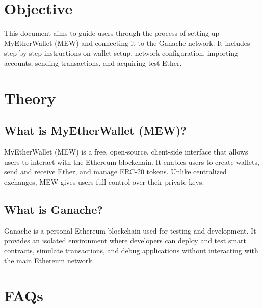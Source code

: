 \documentclass[11pt]{article}
\begin{document}
\tableofcontents
\thispagestyle{empty}
\clearpage


\section{Objective}
This document aims to guide users through the process of setting up MyEtherWallet (MEW) and connecting it to the Ganache network. It includes step-by-step instructions on wallet setup, network configuration, importing accounts, sending transactions, and acquiring test Ether.

\section{Theory}

\subsection{What is MyEtherWallet (MEW)?}
MyEtherWallet (MEW) is a free, open-source, client-side interface that allows users to interact with the Ethereum blockchain. It enables users to create wallets, send and receive Ether, and manage ERC-20 tokens. Unlike centralized exchanges, MEW gives users full control over their private keys.

\subsection{What is Ganache?}
Ganache is a personal Ethereum blockchain used for testing and development. It provides an isolated environment where developers can deploy and test smart contracts, simulate transactions, and debug applications without interacting with the main Ethereum network.

\section{FAQs}
\end{document}
